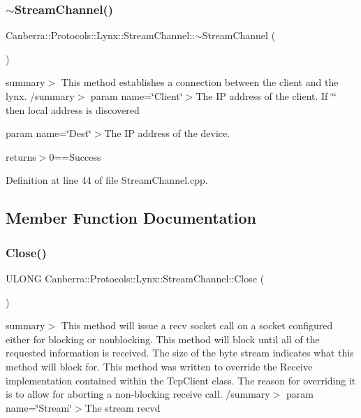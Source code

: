 \subsubsection{\texorpdfstring{$\sim$\+Stream\+Channel()}{~StreamChannel()}}
{\footnotesize\ttfamily Canberra\+::\+Protocols\+::\+Lynx\+::\+Stream\+Channel\+::$\sim$\+Stream\+Channel (\begin{DoxyParamCaption}{ }\end{DoxyParamCaption})\hspace{0.3cm}{\ttfamily [virtual]}}

summary$>$ This method establishes a connection between the client and the lynx. /summary$>$ param name=\char`\"{}\+Client\char`\"{}$>$The IP address of the client. If \char`\"{}\char`\"{} then local address is discovered

param name=\char`\"{}\+Dest\char`\"{}$>$The IP address of the device.

returns$>$0==Success

Definition at line 44 of file Stream\+Channel.\+cpp.



\subsection{Member Function Documentation}
\mbox{\label{class_canberra_1_1_protocols_1_1_lynx_1_1_stream_channel_ae17c78aeb2b818dde70190333800101c_ae17c78aeb2b818dde70190333800101c}} 
\subsubsection{\texorpdfstring{Close()}{Close()}}
{\footnotesize\ttfamily U\+L\+O\+NG Canberra\+::\+Protocols\+::\+Lynx\+::\+Stream\+Channel\+::\+Close (\begin{DoxyParamCaption}{ }\end{DoxyParamCaption})}

summary$>$ This method will issue a recv socket call on a socket configured either for blocking or nonblocking. This method will block until all of the requested information is received. The size of the byte stream indicates what this method will block for. This method was written to override the Receive implementation contained within the Tcp\+Client class. The reason for overriding it is to allow for aborting a non-\/blocking receive call. /summary$>$ param name=\char`\"{}\+Stream\char`\"{}$>$The stream recv\textquotesingle{}d

